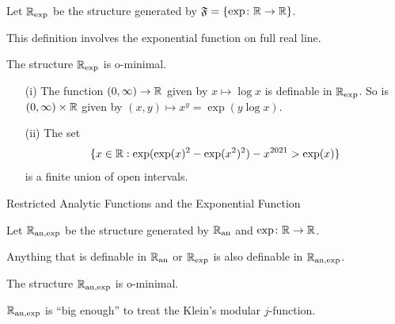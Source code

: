 \documentclass{beamer}
\begin{document}
\begin{frame}
  \begin{definition}
    Let ${{\mathbb{R}}_{\mathrm{exp}}}$ be the structure generated by
    $\mathfrak{F} = \{ \exp \colon {\mathbb{R}}\rightarrow{\mathbb{R}}\}$. 
  \end{definition}

This definition involves the exponential function on \alert{full}
{real} line.

\begin{theorem}[Wilkie]
  The structure ${{\mathbb{R}}_{\mathrm{exp}}}$ is o-minimal.
\end{theorem}

\begin{example}
  \begin{enumerate}
  \item [(i)]
    The function $(0,\infty)\rightarrow{\mathbb{R}}$ given by $x\mapsto \log x$
    is definable in ${{\mathbb{R}}_{\mathrm{exp}}}$.
    So is $(0,\infty)\times{\mathbb{R}}$ given by $(x,y)\mapsto x^y = \exp(y\log x)$.
  \item[(ii)]The set
      $$\{x\in{\mathbb{R}} : \exp(\exp(x)^2-\exp(x^2)^2)-x^{2021} > \exp(x)\}$$
      is a finite union of open intervals.
  \end{enumerate}
\end{example}
\end{frame}

\begin{frame}{Restricted Analytic Functions and the Exponential Function}

  \begin{definition}
    Let ${{\mathbb{R}}_{\mathrm{an,exp}}}$ be the structure generated by 
    ${{\mathbb{R}}_{\mathrm{an}}}$
    and $\exp \colon {\mathbb{R}}\rightarrow{\mathbb{R}}$.
  \end{definition}

  Anything that is definable in ${{\mathbb{R}}_{\mathrm{an}}}$ or ${{\mathbb{R}}_{\mathrm{exp}}}$ is also definable
  in  ${{\mathbb{R}}_{\mathrm{an,exp}}}$.

  \begin{theorem}
    The structure ${{\mathbb{R}}_{\mathrm{an,exp}}}$ is o-minimal.
  \end{theorem}

  ${{\mathbb{R}}_{\mathrm{an,exp}}}$ is ``big enough'' to treat the Klein's
  modular $j$-function. 
\end{frame}
\end{document}
